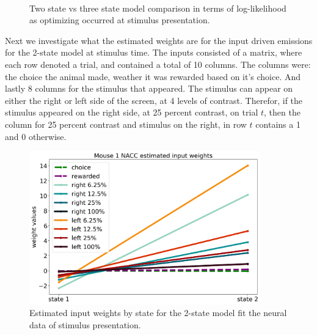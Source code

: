 \documentclass{article}
\begin{document}
\begin{figure}[H]
    \centering
     \hspace*{-0.9em}
     \\
    \caption{Two state vs three state model comparison in terms of log-likelihood as optimizing occurred at stimulus presentation.}
\end{figure}
Next we investigate what the estimated weights are for the input driven emissions for the 2-state model at stimulus time. The inputs consisted of a matrix, where each row denoted a trial, and contained a total of 10 columns. The columns were: the choice the animal made, weather it was rewarded based on it's choice. And lastly 8 columns for the stimulus that appeared. The stimulus can appear on either the right or left side of the screen, at 4 levels of contrast. Therefor, if the stimulus appeared on the right side, at 25 percent contrast, on trial $t$, then the column for 25 percent contrast and stimulus on the right, in row $t$ contains a 1 and 0 otherwise. 
\begin{figure}[H]
\centering
 \includegraphics[width=10cm]{stim_images/2state_W.png}
 \caption{Estimated input weights by state for the 2-state model fit the neural data of stimulus presentation.}
\end{figure}
\end{document}

